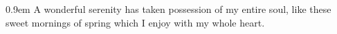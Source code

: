 \documentclass{article}
\begin{document}
\parindent0.9em
\hsize 1.3in
A wonderful serenity has taken possession of my entire soul, like these sweet
mornings of spring which I enjoy with my whole heart.
\end{document}
